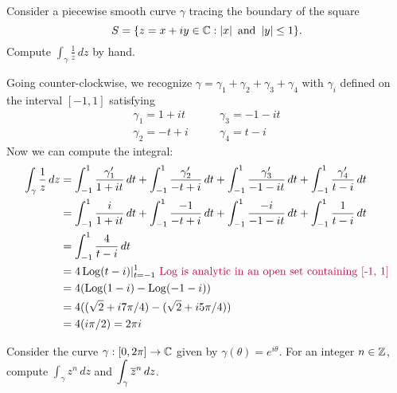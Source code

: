 \documentclass{homework}
\begin{document}
                  \begin{problem}
                  Consider a piecewise smooth curve $\gamma$ tracing the boundary of the square
                    $$S = \{ z = x+iy\in \mathbb{C} : \left|x\right| \mbox{ and } \left|y\right| \leq 1 \}.$$
                      Compute $\displaystyle\int_\gamma \frac{1}{z} \, dz$ by hand.
                      \end{problem}
                      \begin{solution}
                      Going counter-clockwise, we recognize $\gamma = \gamma_1 + \gamma_2 + \gamma_3 + \gamma_4$ with $\gamma_i$ defined on the interval $[-1, 1]$ satisfying
                      \begin{align*}
                      \gamma_1 = 1 + it &\qquad \gamma_3 = -1 - it \\
                      \gamma_2 = -t + i  &\qquad \gamma_4 = t - i
                      \end{align*}
                      Now we can compute the integral:
                      \begin{align*}
                      \int_{\gamma} \frac{1}{z} \, dz 
                      &= \int_{-1}^1 \frac{\gamma_1'}{1 + it} \, dt +
                      \int_{-1}^1 \frac{\gamma_2'}{-t + i} \, dt +
                      \int_{-1}^1 \frac{\gamma_3'}{-1 - it} \, dt +
                      \int_{-1}^1 \frac{\gamma_4'}{t - i} \, dt\\
                      &= \int_{-1}^1 \frac{i}{1 + it} \, dt +
                      \int_{-1}^1 \frac{-1}{-t + i} \, dt +
                      \int_{-1}^1 \frac{-i}{-1 - it} \, dt +
                      \int_{-1}^1 \frac{1}{t - i} \, dt\\
                      &= \int_{-1}^1 \frac{4}{t - i} \, dt\\
                      &= 4\operatorname{Log}(t - i)|_{t=-1}^1\color{purple}\text{ Log is analytic in an open set containing [-1, 1]} \\
                      &= 4(\operatorname{Log}(1 - i)  - \operatorname{Log}(-1 - i))\\
                      &= 4((\sqrt{2} + i7\pi/4) - (\sqrt{2} + i5\pi/4))\\
                      &= 4(i\pi/2) = 2\pi i
                      \end{align*}

                      \end{solution}
                      \begin{problem}\label{integral-powers-of-z}Consider the curve $\gamma : [0,2\pi] \to \mathbb{C}$ given by $\gamma(\theta) = e^{i\theta}$.  For an integer $n \in \mathbb{Z}$, compute $\displaystyle\int_\gamma z^n \, dz$ and $\displaystyle\int_\gamma \overline{z}^n \, dz$.
                      \end{problem}
\end{document}
